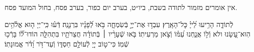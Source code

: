 \documentclass[twoside, openany, parskip=half, 11pt]{book}
\begin{document}
\begin{narrow}
\begin{scriptsize} %
\textsf{
אין אומרים מזמור לתודה בשבת, ביו״ט, בערב יום כפור, בערב פסח, בחול המועד פסח.\\
}\end{scriptsize}
 לְֿתוֹדָ֑ה
הָרִ֥יעוּ לַ֝ייָ֗ כׇּל־הָאָֽרֶץ׃
עִבְד֣וּ אֶת־יְיָ֣ בְּֿשִׂמְחָ֑ה בֹּ֥אוּ לְֿ֝פָנָ֗יו בִּרְנָנָֽה׃
דְּֿע֗וּ כִּֽי־יְיָ ה֤וּא אֱלֹ֫הִ֥ים הֽוּא־עָ֭שָׂנוּ ולא וְֿל֣וֹ אֲנַ֑חְנוּ עַ֝מּ֗וֹ וְֿצֹ֣אן מַרְעִיתֽוֹ׃
בֹּ֤אוּ שְֿׁעָרָ֨יו ׀ בְּֿתוֹדָ֗ה חֲצֵרֹתָ֥יו בִּתְהִלָּ֑ה הוֹדוּ־ל֗֝וֹ בָּרְֿכ֥וּ שְֿׁמֽוֹ׃
כִּי־ט֣וֹב יְיָ֭ לְֿעוֹלָ֣ם חַסְדּ֑וֹ וְֿעַד־דֹּ֥ר וָ֝דֹ֗ר אֱמוּנָתֽוֹ׃
\end{narrow}
\end{document}
